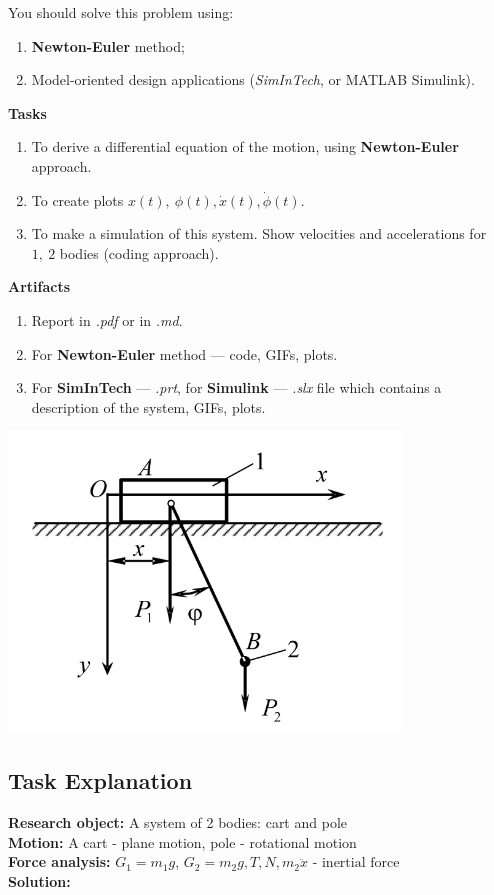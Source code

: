 \documentclass{article}
\begin{document}
You should solve this problem using:
\begin{enumerate}
  \item \textbf{Newton-Euler} method;
  \item Model-oriented design applications (\textit{SimInTech}, or MATLAB Simulink).
\end{enumerate}
\textbf{Tasks}
\begin{enumerate}
  \item To derive a differential equation of the motion, using \textbf{Newton-Euler} approach.
  \item To create plots $x(t),\ \phi(t), \dot{x}(t), \dot{\phi}(t)$. 
  \item To make a simulation of this system. Show velocities and accelerations for $1,\ 2$ bodies (coding approach).
\end{enumerate}
\textbf{Artifacts}
\begin{enumerate}
  \item Report in \textit{.pdf} or in \textit{.md}.
  \item For \textbf{Newton-Euler} method --- code, GIFs, plots.
  \item For \textbf{SimInTech} --- \textit{.prt}, for \textbf{Simulink} --- \textit{.slx} file which contains a description of the system, GIFs, plots.
\end{enumerate}


\includegraphics*[scale=0.5]{task_scheme/hw8_task2.png}{\centering}
   
\subsection{Task Explanation}

\textbf{Research object:} A system of 2 bodies: cart and pole\\
\textbf{Motion:} A cart - plane motion, pole - rotational motion\\
\textbf{Force analysis:} $G_1 = m_1 g$, $G_2 = m_2 g, T, N,  m_2 \ddot x \text{ - inertial force}$\\
\textbf{Solution:}
\end{document}
